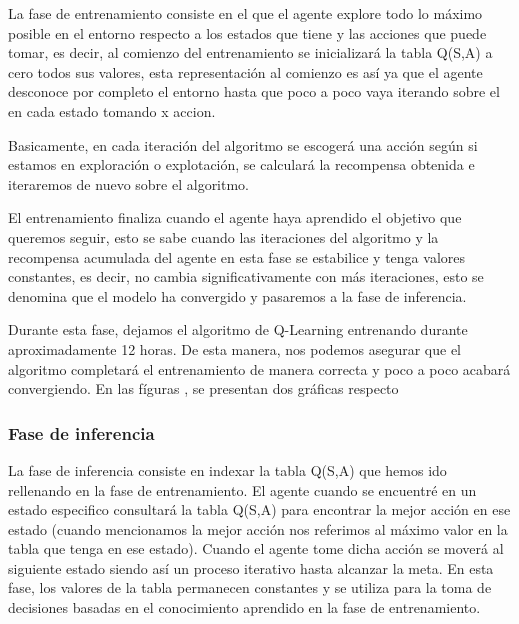  
 La fase de entrenamiento consiste en el que el agente explore todo lo máximo posible en el entorno respecto a los estados que tiene y las acciones que puede tomar, es decir, al comienzo del entrenamiento se inicializará la tabla Q(S,A) a cero todos sus valores, esta representación
 al comienzo es así ya que el agente desconoce por completo el entorno hasta que poco a poco vaya iterando sobre el en cada estado tomando x accion. \newline
 
 Basicamente, en cada iteración del algoritmo se escogerá una acción según si estamos en exploración o explotación, se calculará la recompensa obtenida e iteraremos de nuevo sobre el algoritmo.

 El entrenamiento finaliza cuando el agente haya aprendido el objetivo que queremos seguir, esto se sabe cuando las iteraciones del algoritmo y la recompensa acumulada del agente en esta 
 fase se estabilice y tenga valores constantes, es decir, no cambia significativamente con más iteraciones, esto se denomina que el modelo ha convergido y pasaremos a la fase de inferencia. \newline

Durante esta fase, dejamos el algoritmo de Q-Learning entrenando durante aproximadamente 12 horas. De esta manera, nos podemos asegurar que el algoritmo completará el entrenamiento de manera correcta y poco a poco 
acabará convergiendo. En las fíguras , se presentan dos gráficas respecto 


\subsubsection{Fase de inferencia}
\label{sec:fases_inferencia}
La fase de inferencia consiste en indexar la tabla Q(S,A) que hemos ido rellenando en la fase de entrenamiento. El agente cuando se encuentré en un estado especifico consultará la tabla Q(S,A) para
encontrar la mejor acción en ese estado (cuando mencionamos la mejor acción nos referimos al máximo valor en la tabla que tenga en ese estado). Cuando el agente tome dicha acción se moverá al siguiente estado
siendo así un proceso iterativo hasta alcanzar la meta. En esta fase, los valores de la tabla permanecen constantes y se utiliza para la toma de decisiones basadas en el conocimiento
aprendido en la fase de entrenamiento. 








  


  




  














        


  

